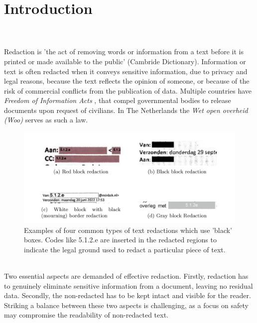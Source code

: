 \chapter{Introduction}

\\\\
Redaction is 'the act of removing words or information from a text before it is printed or made available to the public' (Cambride Dictionary). Information or text is often redacted when it conveys sensitive information, due to privacy and legal reasons, because the text reflects the opinion of someone, or because of the risk of commercial conflicts from the publication of data. Multiple countries have \textit{Freedom of Information Acts} \cite{USAFia}, that compel governmental bodies to release documents upon request of civilians. In The Netherlands the \textit{Wet open overheid (Woo)} \cite{WooWebsite} serves as such a law. 
\begin{figure}[h]
\includegraphics[width=\textwidth]{media/img.png}
\centering
\caption{Examples of four common types of text redactions which use 'black' boxes. Codes like 5.1.2.e are inserted in the redacted regions to indicate the legal ground used to redact a particular piece of text.}
\label{fig:redactionExamples}
\end{figure}\\
Two essential aspects are demanded of effective redaction. Firstly, redaction has to genuinely eliminate sensitive information from a document, leaving no residual data. Secondly, the non-redacted has to be kept intact and visible for the reader. Striking a balance between these two aspects is challenging, as a focus on safety may compromise the readability of non-redacted text.
